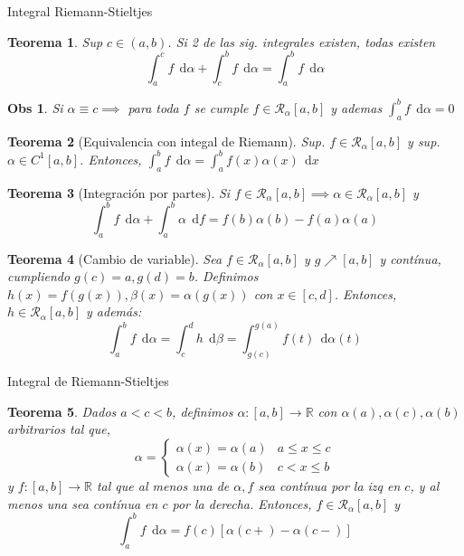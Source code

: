 \documentclass[a4paper]{article}\usepackage{/home/alonso/Documents/Projects/formularios/styles}
\theoremstyle{mytheoremstyle}
\newtheorem{theorem}{Teorema}
\newtheorem*{obs}{Obs}
\newcommand{\R}{\mathbb{R}}
\newcommand{\1}{\mathds{1}}
\newcommand{\diff}[1]{\,\mathrm{d}#1}
\begin{document}
\begin{multicols*}{3}
\begin{roundbox}{Integral Riemann-Stieltjes}
\begin{theorem}
	Sup $c \in (a,b)$. Si 2 de las sig. integrales existen, todas existen
	\[
		\int_{a}^{c} f \; \diff{\alpha} + \int_{c}^{b} f \; \diff{\alpha} = \int_{a}^{b} f \; \diff{\alpha}
	\]
\end{theorem}

\begin{obs}
	Si $\alpha \equiv c \implies$ para toda $f$ se cumple $f \in \mathcal{R}_{\alpha}[a,b]$
	y ademas $\int_{a}^{b} f \; \diff{\alpha} = 0$
\end{obs}

\begin{theorem}[Equivalencia con integal de Riemann]
	Sup. $f \in \mathcal{R}_{\alpha} [a,b]$ y sup. $\alpha \in C^{1} [a,b]$. Entonces, $\int_{a}^{b} f \; \diff{\alpha}  = \int_{a}^{b} f(x) \alpha(x) \; \diff{x} $
\end{theorem}

\begin{theorem}[Integración por partes]
	Si $f \in \mathcal{R}_{\alpha} [a,b] \implies \alpha \in \mathcal{R}_{\alpha} [a,b]$ y
	\[
		\int_{a}^{b} f \; \diff{\alpha}  + \int_{a}^{b} \alpha \; \diff{f} = f(b) \alpha(b) - f(a) \alpha(a)
	\]
\end{theorem}

\begin{theorem}[Cambio de variable]
	Sea $f \in \mathcal{R}_{\alpha} [a,b]$ y $g \nearrow [a,b]$ y contínua, cumpliendo $g(c) = a, g(d) =b$.
	Definimos $h(x) = f(g(x)), \beta(x) = \alpha(g(x))$ con $x \in [c,d]$. Entonces, $h \in \mathcal{R}_{\alpha}[a,b]$ y además:
	\[
		\int_{a}^{b} f \; \diff{\alpha}  = \int_{c}^{d} h \; \diff{\beta} = \int_{g(c)}^{g(a)} f(t) \; \diff{\alpha(t)}
	\]
\end{theorem}
\end{roundbox}

\begin{roundbox}{Integral de Riemann-Stieltjes}
	\begin{theorem}
	Dados $a < c < b$, definimos $ \alpha : [a,b] \to \R  $ con $ \alpha(a), \alpha(c), \alpha(b)$ arbitrarios tal que,
	\[
		\alpha =
		\begin{cases}
			\alpha(x) = \alpha(a) & a \leq x \leq c \\
			\alpha(x) = \alpha(b) & c < x \leq b
		\end{cases}
	\]
	y  $ f : [a,b] \to \R $ tal que al menos una de $ \alpha, f $ sea contínua por la izq en $ c $, y al menos una sea contínua en $ c $ por la derecha. Entonces, $ f \in \mathcal{R}_{\alpha}[a,b] $ y
	\[
		\int_{a}^{b} f \; \diff{\alpha}  = f(c) [ \alpha(c+) - \alpha(c-)]
	\]
	\end{theorem}


\end{roundbox}
\end{multicols*}
\end{document}
